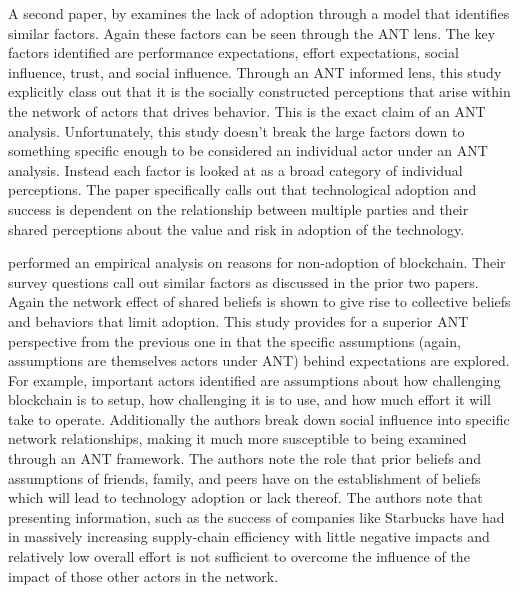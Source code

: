 A second paper, by \parencite{kristofferfranciscoSupplyChainHas2018} examines the lack of adoption through a model that identifies similar factors. Again these factors can be seen through the ANT lens. The key factors identified are performance expectations, effort expectations, social influence, trust, and social influence. Through an ANT informed lens, this study explicitly class out that it is the socially constructed perceptions that arise within the network of actors that drives behavior. This is the exact claim of an ANT analysis. Unfortunately, this study doesn't break the large factors down to something specific enough to be considered an individual actor under an ANT analysis. Instead each factor is looked at as a broad category of individual perceptions. The paper specifically calls out that technological adoption and success is dependent on the relationship between multiple parties and their shared perceptions about the value and risk in adoption of the technology.

\textcite{alazabBlockchainTechnologySupply2020} performed an empirical analysis on reasons for non-adoption of blockchain. Their survey questions call out similar factors as discussed in the prior two papers. Again the network effect of shared beliefs is shown to give rise to collective beliefs and behaviors that limit adoption. This study provides for a superior ANT perspective from the previous one in that the specific assumptions (again, assumptions are themselves actors under ANT) behind expectations are explored. For example, important actors identified are assumptions about how challenging blockchain is to setup, how challenging it is to use, and how much effort it will take to operate. Additionally the authors break down social influence into specific network relationships, making it much more susceptible to being examined through an ANT framework.  The authors note the role that prior beliefs and assumptions of friends, family, and peers have on the establishment of beliefs which will lead to technology adoption or lack thereof. The authors note that presenting information, such as the success of companies like Starbucks have had in massively increasing supply-chain efficiency with little negative impacts and relatively low overall effort is not sufficient to overcome the influence of the impact of those other actors in the network.

